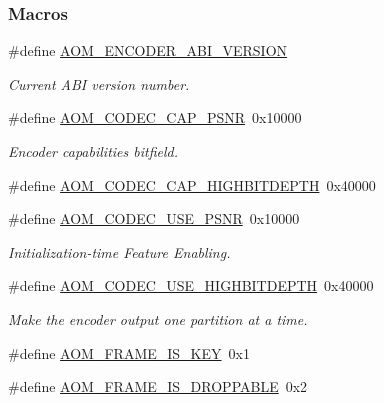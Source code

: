 \subsubsection*{Macros}
\begin{DoxyCompactItemize}
\item 
\#define \hyperlink{group__encoder_gae4af664f2049d5b7d7b644d9a61d497c}{A\+O\+M\+\_\+\+E\+N\+C\+O\+D\+E\+R\+\_\+\+A\+B\+I\+\_\+\+V\+E\+R\+S\+I\+ON}\hypertarget{group__encoder_gae4af664f2049d5b7d7b644d9a61d497c}{}\label{group__encoder_gae4af664f2049d5b7d7b644d9a61d497c}

\begin{DoxyCompactList}\small\item\em Current A\+BI version number. \end{DoxyCompactList}\item 
\#define \hyperlink{group__encoder_gaaf72058c11fcf006c41662114997e12c}{A\+O\+M\+\_\+\+C\+O\+D\+E\+C\+\_\+\+C\+A\+P\+\_\+\+P\+S\+NR}~0x10000
\begin{DoxyCompactList}\small\item\em Encoder capabilities bitfield. \end{DoxyCompactList}\item 
\#define \hyperlink{group__encoder_ga608725216f15096fa209d30fef121c1c}{A\+O\+M\+\_\+\+C\+O\+D\+E\+C\+\_\+\+C\+A\+P\+\_\+\+H\+I\+G\+H\+B\+I\+T\+D\+E\+P\+TH}~0x40000
\item 
\#define \hyperlink{group__encoder_gae722c9f9ba9b4ca8dba6bbe7c0692024}{A\+O\+M\+\_\+\+C\+O\+D\+E\+C\+\_\+\+U\+S\+E\+\_\+\+P\+S\+NR}~0x10000
\begin{DoxyCompactList}\small\item\em Initialization-\/time Feature Enabling. \end{DoxyCompactList}\item 
\#define \hyperlink{group__encoder_gae30bbbdef18e9da3631b69c170533e92}{A\+O\+M\+\_\+\+C\+O\+D\+E\+C\+\_\+\+U\+S\+E\+\_\+\+H\+I\+G\+H\+B\+I\+T\+D\+E\+P\+TH}~0x40000
\begin{DoxyCompactList}\small\item\em Make the encoder output one partition at a time. \end{DoxyCompactList}\item 
\#define \hyperlink{group__encoder_gaf4a58f123913a5eef0a3796f0619e5f3}{A\+O\+M\+\_\+\+F\+R\+A\+M\+E\+\_\+\+I\+S\+\_\+\+K\+EY}~0x1
\item 
\#define \hyperlink{group__encoder_ga5c5a0513ebc6177ce500370cf89ad489}{A\+O\+M\+\_\+\+F\+R\+A\+M\+E\+\_\+\+I\+S\+\_\+\+D\+R\+O\+P\+P\+A\+B\+LE}~0x2\hypertarget{group__encoder_ga5c5a0513ebc6177ce500370cf89ad489}{}\label{group__encoder_ga5c5a0513ebc6177ce500370cf89ad489}


\end{DoxyCompactItemize}
